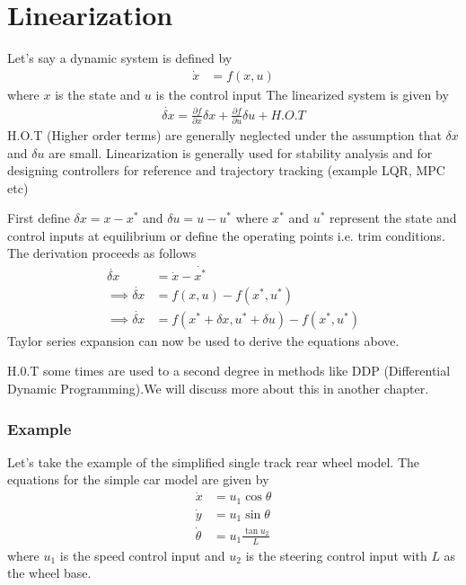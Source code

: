\section{Linearization}\label{chap_1:sec:linearization}
Let's say a dynamic system is defined by
\begin{align}
    \dot{x} &= f(x, u)
\end{align}
where $x$ is the state and $u$ is the control input
The linearized system is given by
\begin{align}
    \dot{\delta x} = \frac{\partial f}{\partial x} \delta x + \frac{\partial f}{\partial u} \delta u + H.O.T
\end{align}
H.O.T (Higher order terms) are generally neglected under the assumption that $\delta x$ and $\delta u$ are small. Linearization is generally used for stability analysis and for designing controllers for reference and trajectory tracking (example LQR, MPC etc) 

First define $\delta x = x - x^{*}$ and $\delta u = u - u^{*}$ where $x^*$ and $u^*$ represent the state and control inputs at equilibrium  or define the operating points i.e. trim conditions.
The derivation proceeds as follows
\begin{align}
    \dot{\delta x} &= \dot{x} - \dot{x^*} \\
    \implies \dot{\delta x} &= f(x, u) - f(x^*, u^*) \\
    \implies \dot{\delta x} &= f(x^* + \delta x, u^* + \delta u)- f(x^*, u^*)
\end{align}
Taylor series expansion can now be used to derive the equations above. 

H.0.T some times are used to a second degree in methods like DDP (Differential Dynamic Programming).We will discuss more about this in another chapter. 

\subsubsection{Example}
Let's take the example of the simplified single track rear wheel model. The equations for the simple car model are given by
\begin{align*}
    \dot{x} &= u_1\cos{\theta} \\
    \dot{y} &= u_1\sin{\theta} \\
    \dot{\theta} &= u_1\frac{\tan u_2}{L}
\end{align*}
where $u_1$ is the speed control input and $u_2$ is the steering control input with $L$ as the wheel base.

